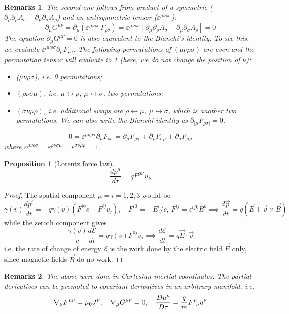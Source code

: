 \documentclass[a4paper]{article}
\newtheorem{remarks}{Remarks}[section]
\theoremstyle{new}
\newtheorem{prop}{Proposition}[section]
\begin{document}
\begin{remarks}
The second one follows from product of a symmetric ($\partial_\mu\partial_\rho A_\sigma-\partial_\mu\partial_\sigma A_\rho$) and an antisymmetric tensor ($\varepsilon^{\mu\nu\rho\sigma}$):
$$\partial_\mu G^{\mu\nu}=\partial_\mu(\varepsilon^{\mu\nu\rho\sigma}F_{\rho\sigma})=\varepsilon^{\mu\nu\rho\sigma}[\partial_\mu\partial_\rho A_\sigma-\partial_\mu\partial_\sigma A_\rho]=0$$
The equation $\partial_\mu G^{\mu\nu}=0$ is also equivalent to the Bianchi's identity. To see this, we evaluate $\varepsilon^{\mu\nu\rho\sigma}\partial_\mu F_{\rho\sigma}$. The following permutations of $(\mu\nu\rho\sigma)$ are even and the permutation tensor will evaluate to 1 (here, we do not change the position of $\nu$):
\begin{itemize}
\item ($\mu\nu\rho\sigma$), i.e. 0 permutations;
\item $(\rho\nu\sigma\mu)$, i.e. $\mu\leftrightarrow\rho$, $\mu\leftrightarrow\sigma$, two permutations; 
\item $(\sigma\nu\mu\rho)$, i.e. additional swaps are $\rho\leftrightarrow\mu$, $\mu\leftrightarrow\sigma$, which is another two permutations. We can also write the Bianchi identity as $\partial_{[\mu}F_{\rho\sigma]}=0$.
\end{itemize}
\begin{equation}
0=\varepsilon^{\mu\nu\rho\sigma}\partial_\mu F_{\rho\sigma}=\partial_\mu F_{\rho\sigma}+\partial_\rho F_{\sigma\mu}+\partial_\sigma F_{\mu\rho}\label{BianchiEM}
\end{equation}
where $\varepsilon^{\mu\nu\rho\sigma}=\varepsilon^{\rho\nu\sigma\mu}=\varepsilon^{\sigma\nu\mu\rho}=1$.
\end{remarks}
\begin{prop}[Lorentz force law]
\begin{equation}
\frac{dp^\mu}{d\tau}=qF^{\mu\nu}u_\nu\label{Lorentz}
\end{equation}
\end{prop}
\begin{proof}
The spatial component $\mu=i=1,2,3$ would be
$$\gamma(v)\frac{dp^i}{dt}=-q\gamma(v)(F^{i0}c-F^{ij}v_j),\quad F^{i0}=-E^i/c,~F^{ij}=\epsilon^{ijk}B^k\implies\frac{d\vec{p}}{dt}=q(\vec{E}+\vec{v}\times\vec{B})$$
while the zeroth component gives
$$\frac{\gamma(v)}{c}\frac{d\mathcal{E}}{dt}=q\gamma(v)F^{0j}v_j\implies\frac{d\mathcal{E}}{dt}=q\vec{E}\cdot\vec{v}$$
i.e. the rate of change of energy $\mathcal{E}$ is the work done by the electric field $\vec{E}$ only, since magnetic fields $\vec{B}$ do no work.
\end{proof}
\begin{remarks}
The above were done in Cartesian inertial coordinates. The partial derivatives can be promoted to covariant derivatives in an arbitrary manifold, i.e.
$$\nabla_\mu F^{\mu\nu}=\mu_0 J^\nu,\quad \nabla_\mu G^{\mu\nu}=0,\quad\frac{Du^\mu}{D\tau}=\frac{q}{m}\tensor*{F}{*_{}^{\mu}_{\nu}}u^\nu$$
\end{remarks}
\newpage
\end{document}
